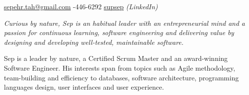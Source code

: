 \documentclass[10pt,a4paper]{article}
\begin{document}
\sloppy  %


\nobreakvspace{0.3em}  %

\noindent\href{mailto:sepehr.tah.at.gmail.dot.com}{sepehr.tah\mbox{}@\mbox{}gmail.com}\sbull
{}-446-6292\sbull
\href{http://www.linkedin.com/in/supsep}{supsep} \emph{(LinkedIn)}


\spacedhrule{0.9em}{-0.4em}  %


\vspace{-1.3em}  %
\begin{multicols}{2}  %
\emph{Curious by nature, Sep is an habitual leader with an entrepreneurial
mind and a passion for continuous learning, software engineering and delivering value
by designing and developing well-tested, maintainable software.}

Sep is a leader by nature, a Certified Scrum Master and an award-winning Software Engineer. His interests span from topics such as Agile methodology, team-building and efficiency to databases, software architecture, programming languages design, user interfaces and user experience.

\end{multicols}


\spacedhrule{0em}{-0.4em}

\end{document}
